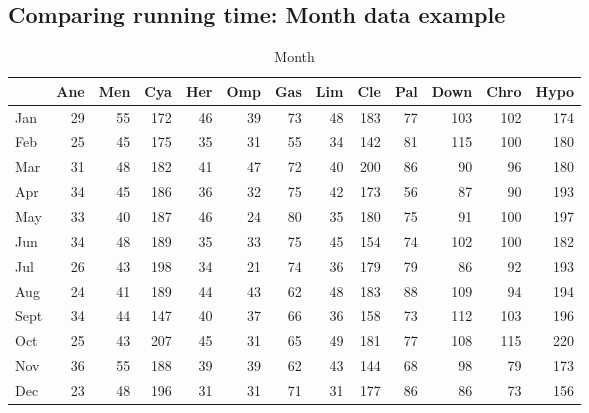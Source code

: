 \documentclass[article,nojss]{jss}\usepackage[]{graphicx}\usepackage[]{color}
\newenvironment{knitrout}{}{} %
\begin{document}
\subsection{Comparing running time: Month data example}

\begin{knitrout}
\color{fgcolor}\begin{table}[H]

\caption{\label{tab:monthdata}Month\label{tab:month}}
\centering
\begin{tabular}[t]{l|r|r|r|r|r|r|r|r|r|r|r|r}
\hline
  & Ane & Men & Cya & Her & Omp & Gas & Lim & Cle & Pal & Down & Chro & Hypo\\
\hline
Jan & 29 & 55 & 172 & 46 & 39 & 73 & 48 & 183 & 77 & 103 & 102 & 174\\
\hline
Feb & 25 & 45 & 175 & 35 & 31 & 55 & 34 & 142 & 81 & 115 & 100 & 180\\
\hline
Mar & 31 & 48 & 182 & 41 & 47 & 72 & 40 & 200 & 86 & 90 & 96 & 180\\
\hline
Apr & 34 & 45 & 186 & 36 & 32 & 75 & 42 & 173 & 56 & 87 & 90 & 193\\
\hline
May & 33 & 40 & 187 & 46 & 24 & 80 & 35 & 180 & 75 & 91 & 100 & 197\\
\hline
Jun & 34 & 48 & 189 & 35 & 33 & 75 & 45 & 154 & 74 & 102 & 100 & 182\\
\hline
Jul & 26 & 43 & 198 & 34 & 21 & 74 & 36 & 179 & 79 & 86 & 92 & 193\\
\hline
Aug & 24 & 41 & 189 & 44 & 43 & 62 & 48 & 183 & 88 & 109 & 94 & 194\\
\hline
Sept & 34 & 44 & 147 & 40 & 37 & 66 & 36 & 158 & 73 & 112 & 103 & 196\\
\hline
Oct & 25 & 43 & 207 & 45 & 31 & 65 & 49 & 181 & 77 & 108 & 115 & 220\\
\hline
Nov & 36 & 55 & 188 & 39 & 39 & 62 & 43 & 144 & 68 & 98 & 79 & 173\\
\hline
Dec & 23 & 48 & 196 & 31 & 31 & 71 & 31 & 177 & 86 & 86 & 73 & 156\\
\hline
\end{tabular}
\end{table}

\end{knitrout}
\end{document}
